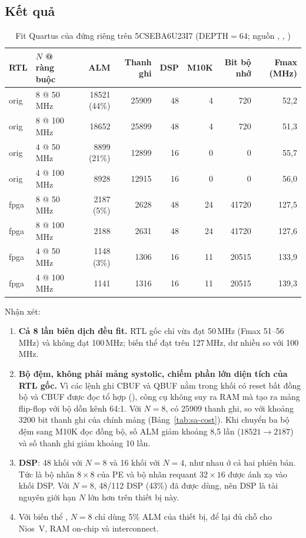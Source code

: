 \subsection{Kết quả}
\begin{table}[H]
  \centering
  \caption{Fit Quartus của  đứng riêng trên 5CSEBA6U23I7 (DEPTH$=64$; nguồn , , )}
  \label{tab:quartus-npu}
  \small
  \begin{tabular}{llrrrrrr}
    \toprule
    RTL & $N$ @ ràng buộc & ALM & Thanh ghi & DSP & M10K & Bit bộ nhớ & Fmax (MHz) \\
    \midrule
    orig & 8 @ 50\,MHz & \num{18521} (44\%) & \num{25909} & 48 & 4 & 720 & 52,2 \\
    orig & 8 @ 100\,MHz & \num{18652} & \num{25899} & 48 & 4 & 720 & 51,3 \\
    orig & 4 @ 50\,MHz & \num{8899} (21\%) & \num{12899} & 16 & 0 & 0 & 55,7 \\
    orig & 4 @ 100\,MHz & \num{8928} & \num{12915} & 16 & 0 & 0 & 56,0 \\
    \midrule
    fpga & 8 @ 50\,MHz & \num{2187} (5\%) & \num{2628} & 48 & 24 & \num{41720} & 127,5 \\
    fpga & 8 @ 100\,MHz & \num{2188} & \num{2631} & 48 & 24 & \num{41720} & 127,6 \\
    fpga & 4 @ 50\,MHz & \num{1148} (3\%) & \num{1306} & 16 & 11 & \num{20515} & 133,9 \\
    fpga & 4 @ 100\,MHz & \num{1141} & \num{1316} & 16 & 11 & \num{20515} & 139,3 \\
    \bottomrule
  \end{tabular}
\end{table}

Nhận xét:
\begin{enumerate}
  \item \textbf{Cả 8 lần biên dịch đều fit.} RTL gốc chỉ vừa đạt 50\,MHz (Fmax 51--56\,MHz) và không đạt 100\,MHz; biến thể  đạt trên 127\,MHz, dư nhiều so với 100\,MHz.
  \item \textbf{Bộ đệm, không phải mảng systolic, chiếm phần lớn diện tích của RTL gốc.} Vì các lệnh ghi CBUF và QBUF nằm trong khối  có reset bất đồng bộ và CBUF được đọc tổ hợp (), công cụ không suy ra RAM mà tạo ra mảng flip-flop với bộ dồn kênh 64:1. Với $N=8$, có \num{25909} thanh ghi, so với khoảng \num{3200} bit thanh ghi của chính mảng (Bảng~\ref{tab:sa-cost}). Khi chuyển ba bộ đệm sang M10K đọc đồng bộ, số ALM giảm khoảng 8,5 lần ($\num{18521}\to\num{2187}$) và số thanh ghi giảm khoảng 10 lần.
  \item \textbf{DSP}: 48 khối với $N=8$ và 16 khối với $N=4$, như nhau ở cả hai phiên bản. Tức là bộ nhân $8\times8$ của PE và bộ nhân requant $32\times16$ được ánh xạ vào khối DSP. Với $N=8$, 48/112 DSP (43\%) đã được dùng, nên DSP là tài nguyên giới hạn $N$ lớn hơn trên thiết bị này.
  \item Với biến thể , $N=8$ chỉ dùng 5\% ALM của thiết bị, để lại đủ chỗ cho Nios~V, RAM on-chip và interconnect.
\end{enumerate}

